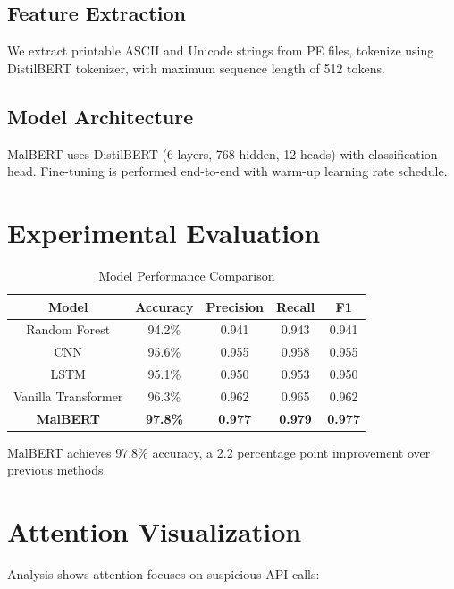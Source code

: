 \documentclass[conference]{IEEEtran}
\begin{document}
\subsection{Feature Extraction}

We extract printable ASCII and Unicode strings from PE files, tokenize using DistilBERT tokenizer, with maximum sequence length of 512 tokens.

\subsection{Model Architecture}

MalBERT uses DistilBERT (6 layers, 768 hidden, 12 heads) with classification head. Fine-tuning is performed end-to-end with warm-up learning rate schedule.

\section{Experimental Evaluation}

\begin{table}[htbp]
\caption{Model Performance Comparison}
\begin{center}
\begin{tabular}{|c|c|c|c|c|}
\hline
\textbf{Model} & \textbf{Accuracy} & \textbf{Precision} & \textbf{Recall} & \textbf{F1} \\
\hline
Random Forest & 94.2\% & 0.941 & 0.943 & 0.941 \\
CNN & 95.6\% & 0.955 & 0.958 & 0.955 \\
LSTM & 95.1\% & 0.950 & 0.953 & 0.950 \\
Vanilla Transformer & 96.3\% & 0.962 & 0.965 & 0.962 \\
\textbf{MalBERT} & \textbf{97.8\%} & \textbf{0.977} & \textbf{0.979} & \textbf{0.977} \\
\hline
\end{tabular}
\label{tab:results}
\end{center}
\end{table}

MalBERT achieves 97.8\% accuracy, a 2.2 percentage point improvement over previous methods.

\section{Attention Visualization}

Analysis shows attention focuses on suspicious API calls:
\end{document}
